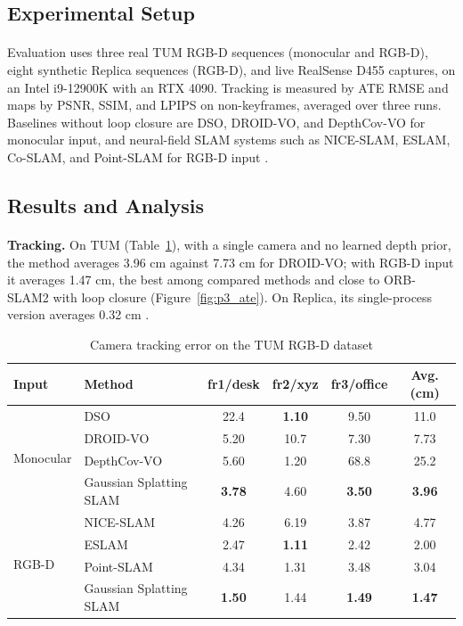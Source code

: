 \documentclass[12pt,a4paper,final]{extreport}
\begin{document}
\subsection{Experimental Setup}

\paragraph{} Evaluation uses three real TUM RGB-D sequences (monocular and RGB-D), eight synthetic Replica sequences (RGB-D), and live RealSense D455 captures, on an Intel i9-12900K with an RTX 4090. Tracking is measured by ATE RMSE and maps by PSNR, SSIM, and LPIPS on non-keyframes, averaged over three runs. Baselines without loop closure are DSO, DROID-VO, and DepthCov-VO for monocular input, and neural-field SLAM systems such as NICE-SLAM, ESLAM, Co-SLAM, and Point-SLAM for RGB-D input \cite{p3}.

\subsection{Results and Analysis}

\paragraph{} \textbf{Tracking.} On TUM (Table~\ref{tab:p3_tum}), with a single camera and no learned depth prior, the method averages 3.96 cm against 7.73 cm for DROID-VO; with RGB-D input it averages 1.47 cm, the best among compared methods and close to ORB-SLAM2 with loop closure (Figure~\ref{fig:p3_ate}). On Replica, its single-process version averages 0.32 cm \cite{p3}.

{\renewcommand{\arraystretch}{1.12}
\begin{table}[htbp]
\centering
\caption{Camera tracking error on the TUM RGB-D dataset}\label{tab:p3_tum}
\small
\begin{tabular}{|l|l|c|c|c|c|}
\hline
\textbf{Input} & \textbf{Method} & \textbf{fr1/desk} & \textbf{fr2/xyz} & \textbf{fr3/office} & \textbf{Avg. (cm)} \\ \hline
\multirow{4}{*}{Monocular} & DSO & 22.4 & \textbf{1.10} & 9.50 & 11.0 \\ \cline{2-6}
 & DROID-VO & 5.20 & 10.7 & 7.30 & 7.73 \\ \cline{2-6}
 & DepthCov-VO & 5.60 & 1.20 & 68.8 & 25.2 \\ \cline{2-6}
 & Gaussian Splatting SLAM & \textbf{3.78} & 4.60 & \textbf{3.50} & \textbf{3.96} \\ \hline
\multirow{4}{*}{RGB-D} & NICE-SLAM & 4.26 & 6.19 & 3.87 & 4.77 \\ \cline{2-6}
 & ESLAM & 2.47 & \textbf{1.11} & 2.42 & 2.00 \\ \cline{2-6}
 & Point-SLAM & 4.34 & 1.31 & 3.48 & 3.04 \\ \cline{2-6}
 & Gaussian Splatting SLAM & \textbf{1.50} & 1.44 & \textbf{1.49} & \textbf{1.47} \\ \hline
\end{tabular}
\end{table}}
\end{document}

